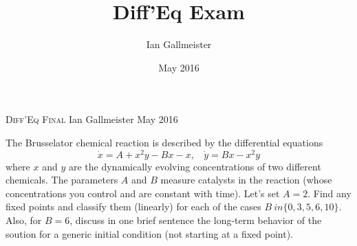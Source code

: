 \documentclass{article}
\title{Diff'Eq Exam}
\author{Ian Gallmeister}
\date{May 2016}
\begin{document}
\Large
\textsc{Diff'Eq Final}
\newline \normalsize Ian Gallmeister
\newline May 2016


\newline The Brusselator chemical reaction is described by the differential equations
\[
\dot{x} = A + x^2y - Bx - x, \:\:\:\: \dot{y} = Bx - x^2y
\]
where $x$ and $y$ are the dynamically evolving concentrations of two different chemicals.  The parameters $A$ and $B$ measure catalysts in the reaction (whose concentrations you control and are constant with time).  Let's set $A = 2$.  Find any fixed points and classify them (linearly) for each of the cases $B \ in \{0, 3, 5, 6, 10\}$.  Also, for $B = 6$, discuss in one brief sentence the long-term behavior of the soution for a generic initial condition (not starting at a fixed point).
\end{document}
